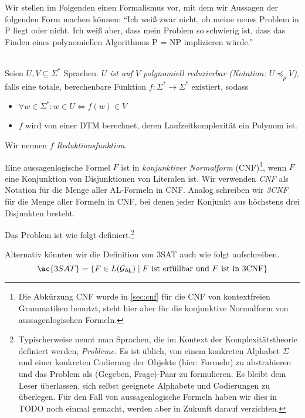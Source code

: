Wir stellen im Folgenden einen Formalismus vor, mit dem wir
Aussagen der folgenden Form machen können:
"`Ich weiß zwar nicht, ob meine neues Problem in \ac{P} liegt oder nicht.
Ich weiß aber, dass mein Problem so schwierig ist, dass das Finden eines polynomiellen Algorithmus \ac{P} = \ac{NP} implizieren würde."'


\begin{Def}\label{def:PolyReduktion}\ \\
  Seien $U, V \subseteq \Sigma^*$ Sprachen.
  \emph{$U$ ist auf $V$ polynomiell reduzierbar (Notation: $U \preceq_p V$)}, falls eine totale, berechenbare Funktion
  $f:\Sigma^* \to \Sigma^*$ existiert, sodass
  \begin{itemize}
   \item $\forall w \in \Sigma^*:w \in U \iff f(w) \in V$
   \item $f$ wird von einer \ac{DTM} berechnet, deren Laufzeitkomplexität ein Polynom ist.
  \end{itemize}
  Wir nennen $f$ \emph{Reduktionsfunktion}.
\end{Def}

Eine aussagenlogische Formel $F$ ist in \emph{konjunktiver Normalform} (CNF)\footnote{%
Die Abkürzung \ac{CNF} wurde in \autoref{sec:cnf} für die \acl{CNF} von kontextfreien Grammatiken benutzt,
steht hier aber für die konjunktive Normalform von aussagenlogischen Formeln.
}, wenn $F$ eine Konjunktion von Disjunktionen von Literalen ist.
Wir verwenden \emph{CNF} als Notation für die Menge aller AL-Formeln in CNF.
Analog schreiben wir \emph{3CNF} für die Menge aller Formeln in CNF, bei denen jeder Konjunkt aus höchstens drei Disjunkten besteht.



\begin{Def}[name={[3SAT]}]
Das Problem  ist wie folgt definiert.\footnote{
Typischerweise nennt man Sprachen, die im Kontext der Komplexitätstheorie definiert werden, \emph{Probleme}.
Es ist üblich, von einem konkreten Alphabet $\Sigma$ und einer konkreten Codierung der Objekte (hier: Formeln) zu abstrahieren und das Problem als (Gegeben, Frage)-Paar zu formulieren.
Es bleibt dem Leser überlassen, sich selbst geeignete Alphabete und Codierungen zu überlegen.
Für den Fall von aussagenlogische Formeln haben wir dies in {\color{red} TODO} noch einmal gemacht, werden aber in Zukunft darauf verzichten.}
\begin{center}
\end{center}
	
\end{Def}
Alternativ könnten wir die Definition von \ac{3SAT} auch wie folgt aufschreiben.
$$\ac{3SAT} = \{F\in L(\mathcal{G}_\mathsf{AL})\mid F \text{ ist erfüllbar und $F$ ist in 3CNF}\}$$

